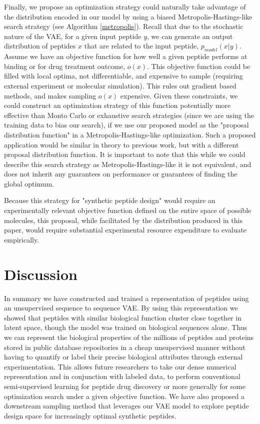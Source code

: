 \documentclass[final,1p,times]{elsarticle}
\begin{document}
Finally, we propose an optimization strategy could naturally take advantage of the distribution encoded in our model by using a biased Metropolis-Hastings-like search strategy (see Algorithm \ref{metropolis}). Recall that due to the stochastic nature of the VAE, for a given input peptide $y$, we can generate an output distribution of peptides $x$ that are related to the input peptide, $p_{model}(x|y)$. Assume we have an objective function for how well a given peptide performs at binding or for drug treatment outcome, $o(x)$. This objective function could be filled with local optima, not differentiable, and expensive to sample (requiring external experiment or molecular simulation). This rules out gradient based methods, and makes sampling $o(x)$ expensive. Given these constraints, we could construct an optimization strategy of this function potentially more effective than Monto Carlo or exhaustive search strategies (since we are using the training data to bias our search), if we use our proposed model as the "proposal distribution function" in a Metropolis-Hastings-like optimization. Such a proposed application would be similar in theory to previous work, but with a different proposal distribution function\cite{giguere2013improved}. It is important to note that this while we could describe this search strategy as Metropolis-Hastings-like it is not equivalent, and does not inherit any guarantees on performance or guarantees of finding the global optimum.

Because this strategy for "synthetic peptide design" would require an experimentally relevant objective function defined on the entire space of possible molecules, this proposal, while facilitated by the distribution produced in this paper, would require substantial experimental resource expenditure to evaluate empirically.



\section{Discussion}

In summary we have constructed and trained a representation of peptides using an unsupervised sequence to sequence VAE. By using this representation we showed that peptides with similar biological function cluster close together in latent space, though the model was trained on biological sequences alone. Thus we can represent the biological properties of the millions of peptides and proteins stored in public database repositories in a cheap unsupervised manner without having to quantify or label their precise biological attributes through external experimentation. This allows future researchers to take our dense numerical representation and in conjunction with labeled data, to perform conventional semi-supervised learning for peptide drug discovery or more generally for some optimization search under a given objective function. We have also proposed a downstream sampling method that leverages our VAE model to explore peptide design space for increasingly optimal synthetic peptides.
\end{document}
